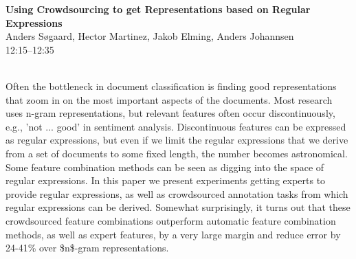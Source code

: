 \documentclass[twoside,makeidx]{book}
\begin{document}
\par\vspace{2em}\noindent%
\begin{minipage}{\linewidth}%
\begin{center}
\textbf{\normalsize Using Crowdsourcing to get Representations based on Regular Expressions}\\
\normalsize  Anders S{\o}gaard,  Hector Martinez,  Jakob Elming,  Anders Johannsen\\
{\small 12:15--12:35}\\
\end{center}
\end{minipage}\\[0.5em]
\nopagebreak%
\noindent%
{\small Often the bottleneck in document classification is finding good representations that zoom in on the most important aspects of the documents. Most research uses n-gram representations, but relevant features often occur discontinuously, e.g., 'not ... good' in sentiment analysis. Discontinuous features can be expressed as regular expressions, but even if we limit the regular expressions that we derive from a set of documents to some fixed length, the number becomes astronomical. Some feature combination methods can be seen as digging into the space of regular expressions. In this paper we present experiments getting experts to provide regular expressions, as well as crowdsourced annotation tasks from which regular expressions can be derived. Somewhat surprisingly, it turns out that these crowdsourced feature combinations outperform automatic feature combination methods, as well as expert features, by a very large margin and reduce error by 24-41\% over \$n\$-gram representations.}
\clearpage
\end{document}
